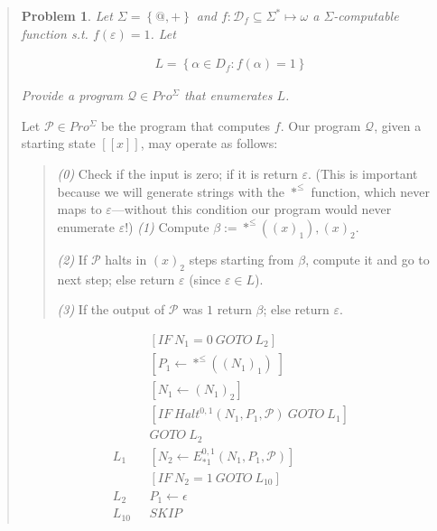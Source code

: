 \documentclass[a4paper, 12pt]{article}
\newtheorem{problem}{Problem}
\newtheorem{problem}{Problem}
\begin{document}
\small
\begin{quote}

\begin{problem}
    Let $\Sigma = \left\{ @, + \right\} $ and $f : \mathcal{D}_f \subseteq
    \Sigma^{*} \mapsto \omega$ a $\Sigma$-computable function s.t.
    $f(\varepsilon ) = 1$. Let 

    \begin{align*}
        L = \left\{ \alpha \in D_f : f(\alpha) = 1 \right\} 
    \end{align*}

    Provide a program $\mathcal{Q} \in Pro^{\Sigma}$ that enumerates $L$.
\end{problem}

Let $\mathcal{P} \in Pro^{\Sigma}$ be the program that computes $f$. Our program
$\mathcal{Q}$, given a starting state $[\![ x ]\!]$, may operate as follows: 

\begin{quote}
    \textit{(0)} Check if the input is zero; if it is return $\varepsilon $. (This
    is important because we will generate strings with the $*^{\leq}$ function,
    which never maps to $\varepsilon$---without this condition our program would
    never enumerate $\varepsilon$!)
    \textit{(1)} Compute $\beta := *^{\leq}\left( (x)_1 \right), (x)_2$.

    \textit{(2)} If $\mathcal{P}$ halts in $(x)_2$ steps starting from $\beta$, compute
    it and go to next step; else return $\varepsilon$ (since $\varepsilon \in  L$).  

    \textit{(3)} If the output of $\mathcal{P}$ was $1$ return $\beta$; else return
    $\varepsilon$.
\end{quote}

\begin{align*}
    &[IF ~ N_1 = 0 ~  GOTO ~ L_2] \\
    &\left[P_1 \leftarrow *^{\leq} \left( (N_1)_1 \right) \left] \\ 
    &\left[N_1 \leftarrow (N_1)_2 \right] \\  
    &[IF ~ Halt^{0, 1} \left( N_1, P_1, \mathcal{P} \right) ~ GOTO ~ L_1 ] \\ 
    &GOTO ~ L_2 \\ 
    L_1 ~ ~ ~ & \left[ N_2 \leftarrow E_{* 1}^{0, 1} \left( N_1, P_1,
    \mathcal{P} \right)  \right]  \\ 
              &[IF ~ N_2 = 1 ~ GOTO ~ L_{10}] \\ 
    L_2 ~ ~ ~ &P_1 \leftarrow  \epsilon \\  
    L_{10} ~ ~ ~ & SKIP
\end{align*}



\end{quote}
\end{document}
